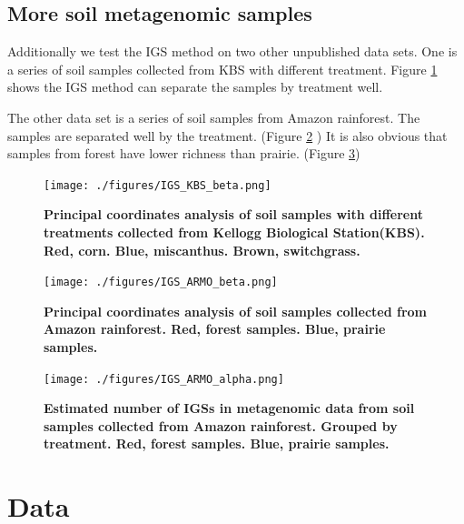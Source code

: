


\subsection{More soil metagenomic samples}

Additionally we test the IGS method on two other unpublished data sets. 
One is a series of soil samples
collected from KBS with different treatment. Figure \ref{fig:KBS_beta}
shows the IGS method can separate
the samples by treatment well. 

The other data set is a series of soil samples from Amazon rainforest. 
The samples are separated well
by the treatment. (Figure \ref{fig:ARMO_beta} ) It is also obvious 
that samples from forest have 
lower richness than prairie. (Figure \ref{fig:ARMO_alpha})




\begin{figure}[!ht]
 \centerline{\texttt{[image: ./figures/IGS\_KBS\_beta.png]}}
\caption{\bf Principal coordinates analysis of soil samples with different
treatments collected from Kellogg Biological Station(KBS). Red, corn. Blue,
miscanthus. Brown, switchgrass.}
\label{fig:KBS_beta}
\end{figure}

\begin{figure}[!ht]
 \centerline{\texttt{[image: ./figures/IGS\_ARMO\_beta.png]}}
\caption{\bf Principal coordinates analysis of soil samples collected from
Amazon rainforest. Red, forest samples. Blue, prairie
samples.}
\label{fig:ARMO_beta}
\end{figure}

\begin{figure}[!ht]
 \centerline{\texttt{[image: ./figures/IGS\_ARMO\_alpha.png]}}
\caption{\bf Estimated number of IGSs in metagenomic data from soil samples
collected from Amazon rainforest. Grouped by treatment. Red, forest samples. Blue, prairie
samples.}

\label{fig:ARMO_alpha}
\end{figure}


\section{Data}


